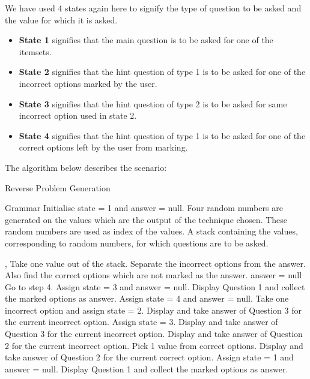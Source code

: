 We have used 4 states again here to signify the type of question to be asked and the value for which it is asked.
\begin{itemize}
\item \textbf{State 1} signifies that the main question is to be asked for one of the itemsets.
\item \textbf{State 2} signifies that the hint question of type 1 is to be asked for one of the incorrect options marked by the user.
\item \textbf{State 3} signifies that the hint question of type 2 is to be asked for same incorrect option used in state 2.
\item \textbf{State 4} signifies that the hint question of type 1 is to be asked for one of the correct options left by the user from marking.
\end{itemize}
The algorithm below describes the scenario:
\begin{algorithm}
\caption{Reverse Problem Generation}
\label{algo:Reverse Problem Generation}

\begin{algorithmic}[1]
\Require Grammar
\State Initialise state = 1 and answer = null. 
\State Four random numbers are generated on the values which are the output of the technique chosen. These random numbers are used as index of the values.
\State A stack containing the values, corresponding to random numbers, for which questions are to be asked.
\end{algorithmic}
\end{algorithm}

\begin{algorithm}                     
\begin{algorithmic} [1]
, 
\State Take one value out of the stack.
\State Separate the incorrect options from the answer.
\State Also find the correct options which are not marked as the answer.
\State answer = null
\State Go to step 4.
\Else
\State Assign state = 3 and answer = null.
\EndIf
\Else
\State Display Question 1 and collect the marked options as answer.
\EndIf
\EndIf
{}
\State Assign state = 4 and answer = null.
\Else
\State Take one incorrect option and assign state = 2.
\EndIf
\Else
\State Display and take answer of Question 3 for the current incorrect option.
\EndIf
\EndIf
{}
\State Assign state = 3.
\State Display and take answer of Question 3 for the current incorrect option.
\Else
\State Display and take answer of Question 2 for the current incorrect option.
\EndIf
\EndIf
{}
\State Pick 1 value from correct options.
\State Display and take answer of Question 2 for the current correct option.
\Else
\State Assign state = 1 and answer = null.
\State Display Question 1 and collect the marked options as answer.
\EndIf
\EndIf
\EndIf
\EndIf
\end{algorithmic}
\end{algorithm}